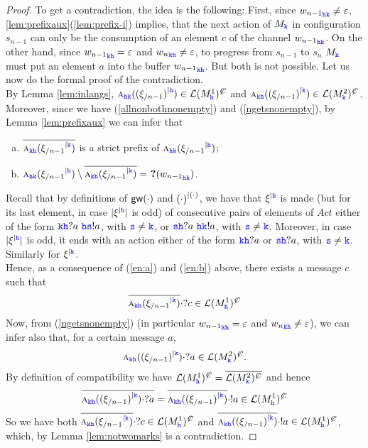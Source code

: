 \begin{proof}
To get a contradiction, the idea is the following: First, since ${{w_{n-1}}}_{\HH\KK} \neq\varepsilon$,
\ref{lem:prefixaux}(\ref{lem:prefix-i})  implies, that the next action of  $M_\KK$ in configuration 
$s_{n-1}$ can only be the consumption of an element $c$ of the channel ${w_{n-1}}_{\HH\KK}$.
 On the other hand, since ${w_{n-1}}_{\KK\HH}= \varepsilon$ and  ${w_{n}}_{\KK\HH} \neq \varepsilon$, to progress from $s_{n-1}$ to $s_n$  $M_\KK$ must put an element $a$ into the buffer ${w_{n-1}}_{\KK\HH}$. But both is not possible.
Let us now do the formal proof of the contradiction. \\
By Lemma \ref{lem:inlangs}, 
$\symb{\HH\KK}{\restrictup{(\upto{\xi}{n-1})}{\HH}}\in \lang{M^1_\HH}^\mC$ and 
$\symb{\KK\HH}{\restrictup{(\upto{\xi}{n-1})}{\KK}} \in \lang{M^2_\KK}^\mC$.\\
Moreover, since we have (\ref{allnonbothnonempty}) and (\ref{ngetsnonempty}), by Lemma \ref{lem:prefixaux} we can infer that  
\begin{enumerate}[a)]
\item 
\label{en:a}
$\Dual{\symb{\KK\HH}{\restrictup{\upto{\xi}{n-1}}{\KK}}}$
 is a strict prefix of
$\symb{\HH\KK}{\restrictup{\upto{\xi}{n-1}}{\HH}}$;
\item
\label{en:b}
$\symb{\HH\KK}{\restrictup{\upto{\xi}{n-1}}{\HH}}\setminus \Dual{\symb{\KK\HH}{\restrictup{\upto{\xi}{n-1}}{\KK}}} = \qm({{w_{n-1}}_{\HH\KK}})$.
\end{enumerate}

Recall that by definitions of $\gateway{\cdot}$ and  $\restrictup{(\cdot)}{(\cdot)}$,  
 we have that $\restrictup{\xi}{\HH}$ is made (but for its last element, in case $|\restrictup{\xi}{\HH}|$ is odd) of consecutive pairs of elements of $\textit{Act}$ either of the form
$\KK\HH?a \,\, \HH\tts!a$, with $\tts\neq\KK$, or $\tts\HH?a \,\,\HH\KK!a$, with $\tts\neq\KK$.
Moreover, in case $|\restrictup{\xi}{\HH}|$ is odd, it ends with an action either of the form
$\KK\HH?a$ or $\tts\HH?a$, with $\tts\neq\KK$.
Similarly for $\restrictup{\xi}{\KK}$.\\


Hence, as a consequence of (\ref{en:a}) and (\ref{en:b}) above, there exists a message $c$ such that 
$$\Dual{\symb{\KK\HH}{\restrictup{\upto{\xi}{n-1}}{\KK}}}\cdot ?c \in \lang{M^1_\HH}^\mC$$
Now, from (\ref{ngetsnonempty}) (in particular ${w_{n-1}}_{\KK\HH} = \varepsilon$ and ${w_{n}}_{\KK\HH} \neq \varepsilon$), we can infer also that, for a certain message $a$,
$$\symb{\KK\HH}{\restrictup{(\upto{\xi}{n-1})}{\KK}}\cdot ?a \in \lang{M^2_\KK}^\mC.$$
By definition of compatibility we have $\lang{M^1_\HH}^\mC = \Dual{\lang{M^2_\KK}^\mC}$ and hence
 $$\Dual{\symb{\KK\HH}{\restrictup{(\upto{\xi}{n-1})}{\KK}}\cdot ?a} = \Dual{\symb{\KK\HH}{\restrictup{(\upto{\xi}{n-1})}{\KK}}}\cdot !a \in \lang{M^1_\HH}^\mC$$
 So we have both $\Dual{\symb{\KK\HH}{\restrictup{\upto{\xi}{n-1}}{\KK}}}\cdot ?c \in \lang{M^1_\HH}^\mC$
 and $ \Dual{\symb{\KK\HH}{\restrictup{(\upto{\xi}{n-1})}{\KK}}}\cdot !a \in \lang{M^1_\HH}^\mC$, which, by Lemma \ref{lem:notwomarks}
 is a contradiction.
\end{proof}

